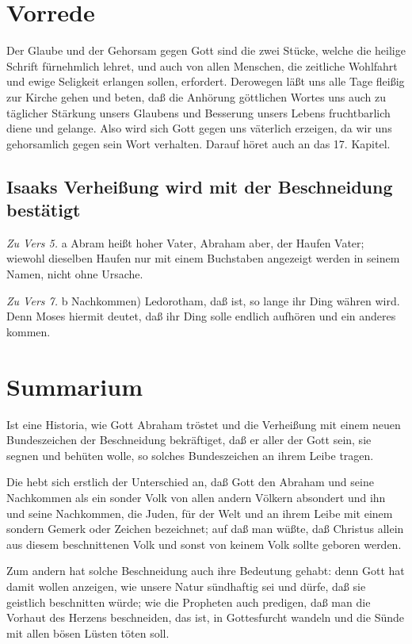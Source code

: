 \section{Vorrede}

Der Glaube und der Gehorsam gegen Gott sind die zwei Stücke, welche die heilige Schrift fürnehmlich lehret, und auch von allen Menschen, die zeitliche Wohlfahrt und ewige Seligkeit erlangen sollen, erfordert. Derowegen läßt uns alle Tage fleißig zur Kirche gehen und beten, daß die Anhörung göttlichen Wortes uns auch zu täglicher Stärkung unsers Glaubens und Besserung unsers Lebens fruchtbarlich diene und gelange. Also wird sich Gott gegen uns väterlich erzeigen, da wir uns gehorsamlich gegen sein Wort verhalten. Darauf höret auch an das 17. Kapitel.

\subsection{Isaaks Verheißung wird mit der Beschneidung bestätigt}

\emph{Zu Vers 5.} a Abram heißt hoher Vater, Abraham aber, der Haufen Vater; wiewohl dieselben Haufen nur mit einem Buchstaben angezeigt werden in seinem Namen, nicht ohne Ursache.

\emph{Zu Vers 7.} b Nachkommen) Ledorotham, daß ist, so lange ihr Ding währen wird. Denn Moses hiermit deutet, daß ihr Ding solle endlich aufhören und ein anderes kommen.

\section{Summarium}

Ist eine Historia, wie Gott Abraham tröstet und die Verheißung mit einem neuen Bundeszeichen der Beschneidung bekräftiget, daß er aller der Gott sein, sie segnen und behüten wolle, so solches Bundeszeichen an ihrem Leibe tragen.

Die hebt sich erstlich der Unterschied an, daß Gott den Abraham und seine Nachkommen als ein sonder Volk von allen andern Völkern absondert und ihn und seine Nachkommen, die Juden, für der Welt und an ihrem Leibe mit einem sondern Gemerk oder Zeichen bezeichnet; auf daß man wüßte, daß Christus allein aus diesem beschnittenen Volk und sonst von keinem Volk sollte geboren werden.

Zum andern hat solche Beschneidung auch ihre Bedeutung gehabt: denn Gott hat damit wollen anzeigen, wie unsere Natur sündhaftig sei und dürfe, daß sie geistlich beschnitten würde; wie die Propheten auch predigen, daß man die Vorhaut des Herzens beschneiden, das ist, in Gottesfurcht wandeln und die Sünde mit allen bösen Lüsten töten soll.

